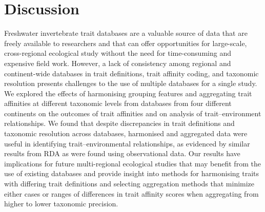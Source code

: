\documentclass{article}
\begin{document}
\clearpage %
\label{fig:boxplots_scores_on_constrained_axis}

\newpage


\section*{Discussion}


Freshwater invertebrate trait databases are a valuable source of data that are freely available to researchers and that can offer opportunities for large-scale, cross-regional ecological study without the need for time-consuming and expensive field work. However, a lack of consistency among regional and continent-wide databases in trait definitions, trait affinity coding, and taxonomic resolution presents challenges to the use of multiple databases for a single study. We explored the effects of harmonising grouping features and aggregating trait affinities at different taxonomic levels from databases from four different continents on the outcomes of trait affinities and on analysis of trait–environment relationships. We found that despite discrepancies in trait definitions and taxonomic resolution across databases, harmonised and aggregated data were useful in identifying trait–environmental relationships, as evidenced by similar results from RDA as were found using observational data. Our results have implications for future multi-regional ecological studies that may benefit from the use of existing databases and provide insight into methods for harmonising traits with differing trait definitions and selecting aggregation methods that minimize either cases or ranges of differences in trait affinity scores when aggregating from higher to lower taxonomic precision.
\end{document}
